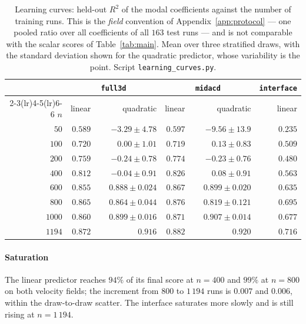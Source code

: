 \documentclass[11pt,a4paper]{article}
\theoremstyle{plain}
\theoremstyle{definition}
\theoremstyle{remark}
\begin{document}
\begin{table}[t]
\centering
\small
\begin{tabular}{@{}rrrrrr@{}}
\toprule
& \multicolumn{2}{c}{\texttt{full3d}} & \multicolumn{2}{c}{\texttt{midacd}} & \texttt{interface} \\
\cmidrule(lr){2-3}\cmidrule(lr){4-5}\cmidrule(lr){6-6}
$n$ & linear & quadratic & linear & quadratic & linear \\
\midrule
$50$    & $0.589$ & $-3.29 \pm 4.78$ & $0.597$ & $-9.56 \pm 13.9$ & $0.235$ \\
$100$   & $0.720$ & $\phantom{-}0.00 \pm 1.01$ & $0.719$ & $\phantom{-}0.13 \pm 0.83$ & $0.509$ \\
$200$   & $0.759$ & $-0.24 \pm 0.78$ & $0.774$ & $-0.23 \pm 0.76$ & $0.480$ \\
$400$   & $0.812$ & $-0.04 \pm 0.91$ & $0.826$ & $\phantom{-}0.08 \pm 0.91$ & $0.563$ \\
$600$   & $0.855$ & $\phantom{-}0.888 \pm 0.024$ & $0.867$ & $\phantom{-}0.899 \pm 0.020$ & $0.635$ \\
$800$   & $0.865$ & $\phantom{-}0.864 \pm 0.044$ & $0.876$ & $\phantom{-}0.819 \pm 0.121$ & $0.695$ \\
$1000$  & $0.860$ & $\phantom{-}0.899 \pm 0.016$ & $0.871$ & $\phantom{-}0.907 \pm 0.014$ & $0.677$ \\
$1194$  & $0.872$ & $\phantom{-}0.916$ & $0.882$ & $\phantom{-}0.920$ & $0.716$ \\
\bottomrule
\end{tabular}
\caption{Learning curves: held-out $R^2$ of the modal coefficients against the
number of training runs. This is the \emph{field} convention of
Appendix~\ref{app:protocol} --- one pooled ratio over all coefficients of all
$163$ test runs --- and is not comparable with the scalar scores of
Table~\ref{tab:main}. Mean over three stratified draws, with the standard
deviation shown for the quadratic predictor, whose variability is the point.
Script \texttt{learning\_curves.py}.}
\label{tab:curves}
\end{table}

\label{meas:saturation}
\paragraph{Saturation}
The linear predictor reaches $94\%$ of its final score at $n=400$ and $99\%$ at
$n=800$ on both velocity fields; the increment from $800$ to $1\,194$ runs is
$0.007$ and $0.006$, within the draw-to-draw scatter. The interface saturates
more slowly and is still rising at $n=1\,194$.
\end{document}
